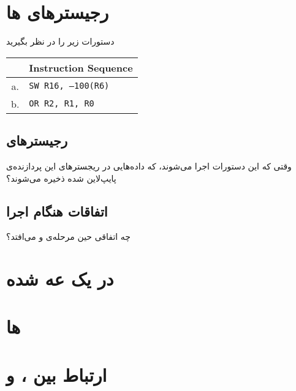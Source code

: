 \documentclass[11pt, dvipsnames, svgnames, x11names]{article}
\begin{document}
\section{رجیستر‌های ها}
دستورات زیر را در نظر بگیرید
\begin{latin}
\begin{table}[H]
\begin{center}
\begin{tabular}{|c|l|}
\hline
& Instruction Sequence \\
\hline
a. &
\texttt{SW R16, –100(R6)} \\
\hline
b. &
\texttt{OR R2, R1, R0} \\ 
\hline
\end{tabular}
\end{center}
\end{table}
\end{latin}
\subsection{رجیستر‌های }
وقتی که این دستورات اجرا می‌شوند، که داده‌هایی در ریجستر‌های این پردازنده‌ی پایپ‌لاین شده ذخیره می‌شوند؟

\subsection{اتفاقات هنگام اجرا}
چه اتفاقی حین مرحله‌ی  و  می‌افتد؟

\section{ در یک  عه  شده}

\section{ها}

\section{ارتباط بین ،  و }
\end{document}
